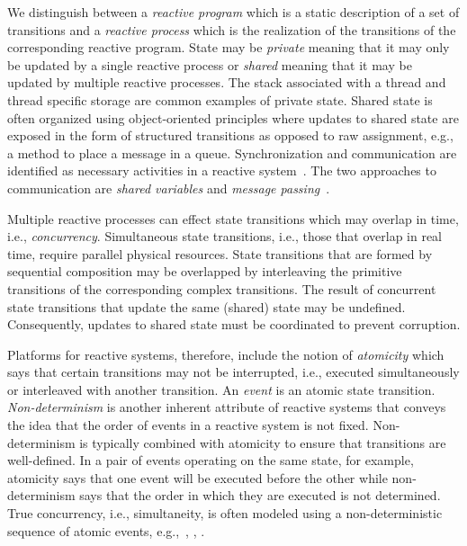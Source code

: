 We distinguish between a \emph{reactive program} which is a static description of a set of transitions and a \emph{reactive process} which is the realization of the transitions of the corresponding reactive program.
State may be \emph{private} meaning that it may only be updated by a single reactive process or \emph{shared} meaning that it may be updated by multiple reactive processes.
The stack associated with a thread and thread specific storage are common examples of private state.
Shared state is often organized using object-oriented principles where updates to shared state are exposed in the form of structured transitions as opposed to raw assignment, e.g., a method to place a message in a queue.
Synchronization and communication are identified as necessary activities in a reactive system~\cite{andrews1983concepts}.
The two approaches to communication are \emph{shared variables} and \emph{message passing}~\cite{andrews1983concepts}.

Multiple reactive processes can effect state transitions which may overlap in time, i.e., \emph{concurrency}.
Simultaneous state transitions, i.e., those that overlap in real time, require parallel physical resources.
State transitions that are formed by sequential composition may be overlapped by interleaving the primitive transitions of the corresponding complex transitions.
The result of concurrent state transitions that update the same (shared) state may be undefined.
Consequently, updates to shared state must be coordinated to prevent corruption.

Platforms for reactive systems, therefore, include the notion of \emph{atomicity} which says that certain transitions may not be interrupted, i.e., executed simultaneously or interleaved with another transition.
An \emph{event} is an atomic state transition.
\emph{Non-determinism} is another inherent attribute of reactive systems that conveys the idea that the order of events in a reactive system is not fixed.
Non-determinism is typically combined with atomicity to ensure that transitions are well-defined.
In a pair of events operating on the same state, for example, atomicity says that one event will be executed before the other while non-determinism says that the order in which they are executed is not determined.
True concurrency, i.e., simultaneity, is often modeled using a non-deterministic sequence of atomic events, e.g.,~\cite{nancy1996distributed}, \cite{chandy1989parallel}, \cite{manna1992temporal}.

